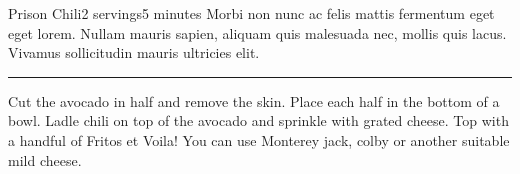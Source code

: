 \begin{recipe}{Prison Chili}{2 servings}{5 minutes}
\freeform Morbi non nunc ac felis mattis fermentum eget eget lorem. Nullam mauris sapien, aliquam quis malesuada nec, mollis quis lacus. Vivamus sollicitudin mauris ultricies elit.\\
\rule{\textwidth}{0.05pt}
Cut the avocado in half and remove the skin. Place each half in the bottom of a bowl.
Ladle chili on top of the avocado and sprinkle with grated cheese.
Top with a handful of Fritos\tm{} et Voila!
\freeform
You can use Monterey jack, colby or another suitable mild cheese.
\end{recipe}
